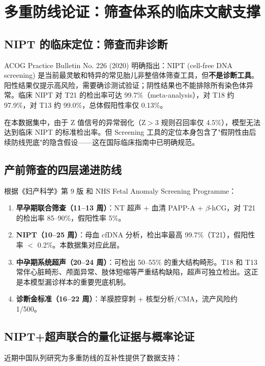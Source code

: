 \documentclass{internal-report}
\begin{document}
\section{多重防线论证：筛查体系的临床文献支撑}

\subsection{NIPT 的临床定位：筛查而非诊断}

ACOG Practice Bulletin No. 226 (2020)\cite{acog2020} 明确指出：NIPT (cell-free DNA screening) 是当前最灵敏和特异的常见胎儿非整倍体筛查工具，但\textbf{不是诊断工具}。阳性结果仅提示高风险，需要确诊测试验证；阴性结果也不能排除所有染色体异常。临床 NIPT 对 T21 的检出率可达 99.7\%（meta-analysis），对 T18 约 97.9\%，对 T13 约 99.0\%，总体假阳性率仅 0.13\%。

在本数据集中，由于 Z 值信号的异常弱化（Z$>$3 规则召回率仅 4.5\%），模型无法达到临床 NIPT 的标准检出率。但 Screening 工具的定位本身包含了"假阴性由后续防线兜底"的隐含假设——这在国际临床指南中已明确规范。

\subsection{产前筛查的四层递进防线}

根据《妇产科学》第 9 版\cite{obgyn9th} 和 NHS Fetal Anomaly Screening Programme：

\begin{enumerate}
    \item \textbf{早孕期联合筛查（11--13 周）}：NT 超声 + 血清 PAPP-A + $\beta$-hCG，对 T21 的检出率 85--90\%，假阳性率 5\%。
    \item \textbf{NIPT（10--25 周）}：母血 cfDNA 分析，检出率最高 99.7\%（T21），假阳性率 $<$ 0.2\%。本数据集对应此层。
    \item \textbf{中孕期系统超声（20--24 周）}：可检出 50--55\% 的重大结构畸形。T18 和 T13 常伴心脏畸形、颅面异常、肢体短缩等严重结构缺陷，超声可独立检出。这正是本模型漏诊样本的重要兜底机制。
    \item \textbf{诊断金标准（16--22 周）}：羊膜腔穿刺 + 核型分析/CMA，流产风险约 1/500。
\end{enumerate}

\subsection{NIPT+超声联合的量化证据与概率论证}

近期中国队列研究为多重防线的互补性提供了数据支持：
\end{document}
